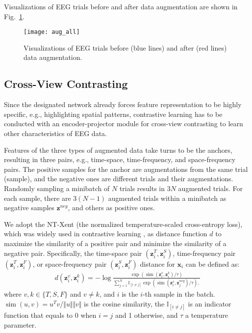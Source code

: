 \documentclass[journal]{IEEEtran}
\begin{document}
Visualizations of EEG trials before and after data augmentation are shown in Fig.~\ref{fig:AugExample}.
\begin{figure}[htpb]\centering
\texttt{[image: aug\_all]}
\caption{Visualizations of EEG trials before (blue lines) and after (red lines) data augmentation.} \label{fig:AugExample}
\end{figure}

\subsection{Cross-View Contrasting}

Since the designated network already forces feature representation to be highly specific, e.g., highlighting spatial patterns, contrastive learning has to be conducted with an encoder-projector module for cross-view contrasting to learn other characteristics of EEG data.

Features of the three types of augmented data take turns to be the anchors, resulting in three pairs, e.g., time-space, time-frequency, and space-frequency pairs. The positive samples for the anchor are augmentations from the same trial (sample), and the negative ones are different trials and their augmentations. Randomly sampling a minibatch of $N$ trials results in $3N$ augmented trials. For each sample, there are $3(N-1)$ augmented trials within a minibatch as negative samples $\boldsymbol{z}^{neg}$, and others as positive ones.

We adopt the NT-Xent (the normalized temperature-scaled cross-entropy loss), which was widely used in contrastive learning \cite{simclr2020}, as distance function $d$ to maximize the similarity of a positive pair and minimize the similarity of a negative pair. Specifically, the time-space pair $(\boldsymbol{z}_{i}^{T}, \boldsymbol{z}_{i}^{S})$, time-frequency pair $(\boldsymbol{z}_{i}^{T}, \boldsymbol{z}_{i}^{F})$, or space-frequency pair $(\boldsymbol{z}_{i}^{S}, \boldsymbol{z}_{i}^{F})$ distance for $\mathbf{x}_i$ can be defined as:
\begin{align}
d(\boldsymbol{z}_{i}^{v}, \mathbf{z}_{i}^{k})=-\log \frac{\exp \left(\operatorname{sim}\left(\boldsymbol{z}_{i}^{v}, \boldsymbol{z}_{i}^{k}\right) / \tau\right)}{\sum_{j=1}^{N} \mathbb{I}_{[i \neq j]} \exp \left(\operatorname{sim} \left(\boldsymbol{z}_{i}^{v}, \boldsymbol{z}_{j}^{neg}\right) / \tau \right),} \label{eq:TFC}
\end{align}
where $v, k \in\{T,S,F\}$ and $v \neq k$, and $i$ is the $i$-th sample in the batch. $\operatorname{sim}\left(u, v\right) = u^{T}v / \Vert u \Vert \Vert v \Vert$ is the cosine similarity, the $\mathbb{I}_{[i \neq j]}$ is an indicator function that equals to 0 when $i = j$ and 1 otherwise, and $\tau$ a temperature parameter.
\end{document}
